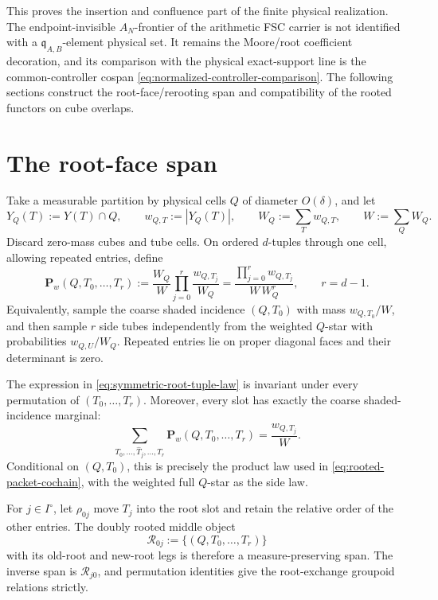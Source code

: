 \documentclass[11pt]{article}
\begin{document}
This proves the insertion and confluence part of the finite physical
realization.  The
endpoint-invisible \(A_N\)-frontier of the arithmetic FSC carrier is not
identified with a \(\mathfrak q_{A,B}\)-element physical set.  It remains the Moore/root
coefficient decoration, and its comparison with the physical exact-support
line is the common-controller cospan
\eqref{eq:normalized-controller-comparison}.  The following sections construct
the root-face/rerooting span and compatibility of the rooted functors on cube
overlaps.

\section{The root-face span}

Take a measurable partition by physical cells \(Q\) of diameter \(O(\delta)\),
and let
\[
 Y_Q(T):=Y(T)\cap Q,
 \qquad
 w_{Q,T}:=|Y_Q(T)|,
 \qquad
 W_Q:=\sum_Tw_{Q,T},
 \qquad
 W:=\sum_QW_Q.
\]
Discard zero-mass cubes and tube cells.  On ordered \(d\)-tuples through one
cell, allowing repeated entries, define
\begin{equation}\label{eq:symmetric-root-tuple-law}
 \mathbf P_w(Q,T_0,\ldots,T_r)
 :=
 \frac{W_Q}{W}
 \prod_{j=0}^r\frac{w_{Q,T_j}}{W_Q}
 =
 \frac{\prod_{j=0}^r w_{Q,T_j}}{W\,W_Q^r},
 \qquad r=d-1.
\end{equation}
Equivalently, sample the coarse shaded incidence \((Q,T_0)\) with mass
\(w_{Q,T_0}/W\), and then sample \(r\) side tubes independently from the
weighted \(Q\)-star with probabilities \(w_{Q,U}/W_Q\).
Repeated entries lie on proper diagonal faces and their determinant is zero.

The expression in \eqref{eq:symmetric-root-tuple-law} is invariant under every
permutation of \((T_0,\ldots,T_r)\).  Moreover, every slot has exactly the
coarse shaded-incidence marginal:
\begin{equation}\label{eq:every-root-marginal}
 \sum_{T_0,\ldots,\widehat T_j,\ldots,T_r}
 \mathbf P_w(Q,T_0,\ldots,T_r)
 =\frac{w_{Q,T_j}}W.
\end{equation}
Conditional on \((Q,T_0)\), this is precisely the product law used in
\eqref{eq:rooted-packet-cochain}, with the weighted full \(Q\)-star as the side
law.

For \(j\in I^\circ\), let \(\rho_{0j}\) move \(T_j\) into the root slot and
retain the relative order of the other entries.  The doubly rooted middle
object
\[
 \mathscr R_{0j}
 :=\{(Q,T_0,\ldots,T_r)\}
\]
with its old-root and new-root legs is therefore a measure-preserving span.
The inverse span is \(\mathscr R_{j0}\), and permutation identities give the
root-exchange groupoid relations strictly.
\end{document}
